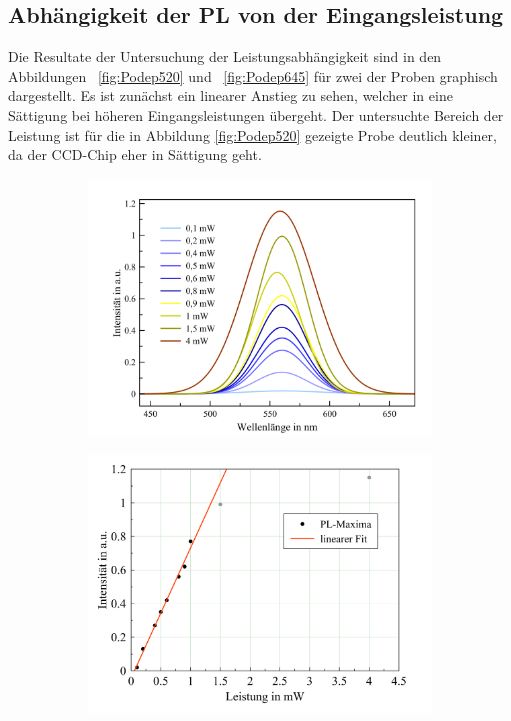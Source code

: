 \newpage
\subsection{Abhängigkeit der PL von der Eingangsleistung}
\label{sec:leistung}
Die Resultate der Untersuchung der Leistungsabhängigkeit sind in den Abbildungen ~\ref{fig:Podep520} und ~\ref{fig:Podep645} für zwei der Proben graphisch dargestellt.
Es ist zunächst ein linearer Anstieg zu sehen, welcher in eine Sättigung bei höheren Eingangsleistungen
übergeht. Der untersuchte Bereich der Leistung ist für die in Abbildung \ref{fig:Podep520} gezeigte Probe deutlich
kleiner, da der CCD-Chip eher in Sättigung geht.
\begin{figure}[H]
  \centering
  \begin{subfigure}{0.5\textwidth}
    \includegraphics[width=\textwidth]{plots/Powerdependence_520nm.png}
  \end{subfigure}
  \begin{subfigure}{0.45\textwidth}
    \includegraphics[width=\textwidth]{plots/Powerdepfit_520.png}

\end{subfigure}
\end{figure}

